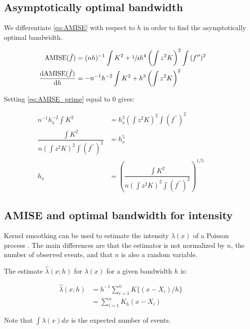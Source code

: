 \subsection{Asymptotically optimal bandwidth}

We differentiate \autoref{eq:AMISE} with respect to $h$ in order to find the asymptotically optimal bandwidth.

\begin{align}
\mbox{AMISE}(\hat{f}) & = (nh)^{-1} \int{K^2} + \sfrac{1}{4}h^4\left(\int{z^2K}\right)^2 \int{ (f^{\prime\prime})^2 } && \nonumber \\
\dfrac{\mathrm{d}\mbox{AMISE}(\hat{f})}{\mathrm{d}h} & = -n^{-1}h^{-2} \int{K^2} + h^3 \left(\int{z^2K}\right)^2 && \label{eq:AMISE_prime}
\end{align}

Setting \autoref{eq:AMISE_prime} equal to 0 gives:

\begin{align}
n^{-1}h_{\mbox{a}}^{-2} \int{K^2} & = h_{\mbox{a}}^3 \left(\int{z^2K}\right)^2 \int{ (f^{\prime\prime})^2 } && \nonumber \\
\dfrac{\int{K^2}}{n \left(\int{z^2K}\right)^2 \int{ (f^{\prime\prime})^2 }} & = h_{\mbox{a}}^5 && \nonumber \\
h_{\mbox{a}} & = \left( \dfrac{\int{K^2}}{n \left(\int{z^2K}\right)^2 \int{ (f^{\prime\prime})^2 }} \right)^{1/5} && \label{eq:H_AMISE}
\end{align}

\subsection{AMISE and optimal bandwidth for intensity}

Kernel smoothing can be used to estimate the intensity $\lambda(x)$ of a Poisson process \citep{brooks1991asymptotic}.
The main differences are that the estimator is not normalized by $n$, the number of observed events, and that $n$ is also a random variable.

The estimate $\hat{\lambda}(x;h)$ for $\lambda(x)$ for a given bandwidth $h$ is:

\begin{align}
    \hat{\lambda}(x;h) & = h^{-1} \sum_{i=1}^{n}{K\{(x-X_i)/h\}} && \nonumber \\
        & = \sum_{i=1}^n{K_h(x-X_i)} &&
\end{align}

Note that $\int{\lambda(x)dx}$ is the expected number of events.

